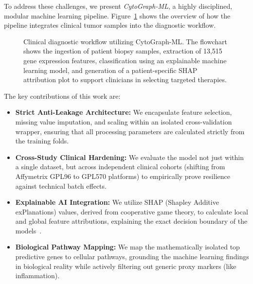 \documentclass[journal,10pt]{IEEEtran}
\begin{document}
To address these challenges, we present \textit{CytoGraph-ML}, a highly disciplined, modular machine learning pipeline. Figure~\ref{fig:clinical_flow} shows the overview of how the pipeline integrates clinical tumor samples into the diagnostic workflow.

\begin{figure}[htbp]
\centering
{}
\caption{Clinical diagnostic workflow utilizing CytoGraph-ML. The flowchart shows the ingestion of patient biopsy samples, extraction of 13,515 gene expression features, classification using an explainable machine learning model, and generation of a patient-specific SHAP attribution plot to support clinicians in selecting targeted therapies.}
\label{fig:clinical_flow}
\end{figure}

The key contributions of this work are:
\begin{itemize}
    \item \textbf{Strict Anti-Leakage Architecture:} We encapsulate feature selection, missing value imputation, and scaling within an isolated cross-validation wrapper, ensuring that all processing parameters are calculated strictly from the training folds.
    \item \textbf{Cross-Study Clinical Hardening:} We evaluate the model not just within a single dataset, but across independent clinical cohorts (shifting from Affymetrix GPL96 to GPL570 platforms) to empirically prove resilience against technical batch effects.
    \item \textbf{Explainable AI Integration:} We utilize SHAP (Shapley Additive exPlanations) values, derived from cooperative game theory, to calculate local and global feature attributions, explaining the exact decision boundary of the models~\cite{shap}.
    \item \textbf{Biological Pathway Mapping:} We map the mathematically isolated top predictive genes to cellular pathways, grounding the machine learning findings in biological reality while actively filtering out generic proxy markers (like inflammation).
\end{itemize}
\end{document}
